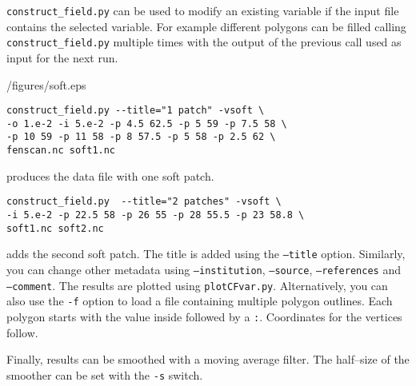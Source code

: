 \texttt{construct\_field.py} can be used to modify an existing variable if the input file contains the selected variable. For example different polygons can be filled calling \texttt{construct\_field.py} multiple times with the output of the previous call used as input for the next run.
\begin{pycf}{}{\dir/figures/soft.eps}
\begin{verbatim}
construct_field.py --title="1 patch" -vsoft \
-o 1.e-2 -i 5.e-2 -p 4.5 62.5 -p 5 59 -p 7.5 58 \
-p 10 59 -p 11 58 -p 8 57.5 -p 5 58 -p 2.5 62 \
fenscan.nc soft1.nc
\end{verbatim}
produces the data file with one soft patch.
\begin{verbatim}
construct_field.py  --title="2 patches" -vsoft \
-i 5.e-2 -p 22.5 58 -p 26 55 -p 28 55.5 -p 23 58.8 \
soft1.nc soft2.nc
\end{verbatim}
adds the second soft patch. The title is added using the \texttt{--title} option. Similarly, you can change other metadata using \texttt{--institution}, \texttt{--source}, \texttt{--references} and \texttt{--comment}. The results are plotted using \texttt{plotCFvar.py}. Alternatively, you can also use the \texttt{-f} option to load a file containing multiple polygon outlines. Each polygon starts with the value inside followed by a \texttt{:}. Coordinates for the vertices follow.
\end{pycf}
Finally, results can be smoothed with a moving average filter. The half--size of the smoother can be set with the \texttt{-s} switch.


